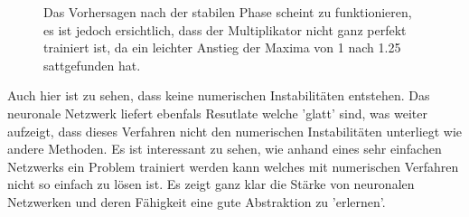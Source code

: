 \begin{figure}
\begin{tabular}{ccc}
	\end{tabular}
	\label{fig:mst_burgers_predict_2}
	\caption{Das Vorhersagen nach der stabilen Phase scheint zu funktionieren, es ist jedoch ersichtlich, dass der Multiplikator nicht ganz perfekt trainiert ist, da ein leichter Anstieg der Maxima von 1 nach 1.25 sattgefunden hat.}
\end{figure}

Auch hier ist zu sehen, dass keine numerischen Instabilitäten entstehen. Das neuronale Netzwerk liefert ebenfals Resutlate welche 'glatt' sind, was weiter aufzeigt, dass dieses Verfahren nicht den numerischen Instabilitäten unterliegt wie andere Methoden. Es ist interessant zu sehen, wie anhand eines sehr einfachen Netzwerks ein Problem trainiert werden kann welches mit numerischen Verfahren nicht so einfach zu lösen ist. Es zeigt ganz klar die Stärke von neuronalen Netzwerken und deren Fähigkeit eine gute Abstraktion zu 'erlernen'.